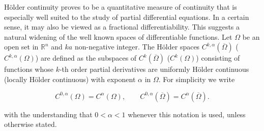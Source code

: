 Hölder continuity proves to be a quantitative measure of continuity that is especially well suited to the study of partial differential equations. In a certain sense, it may also be viewed as a fractional differentiability. This suggests a natural widening of the well known spaces of differentiable functions. Let $\Omega$ be an open set in $\mathbb{R}^n$ and $k a$ non-negative integer. The Hölder spaces $C^{k,\alpha}(\overline{\Omega})$ ($C^{k,\alpha}(\Omega)$) are defined as the subspaces of $C^k(\overline{\Omega})$ ($C^k(\Omega)$) consisting of functions whose $k$-th order partial derivatives are uniformly Hölder continuous (locally Hölder continuous) with exponent $\alpha$ in $\Omega$. For simplicity we write

\[
C^{0,\alpha}(\Omega)=C^\alpha(\Omega),\qquad C^{0,\alpha}(\overline{\Omega})=C^\alpha(\overline{\Omega}).
\]

with the understanding that $0<\alpha<1$ whenever this notation is used, unless otherwise stated.


